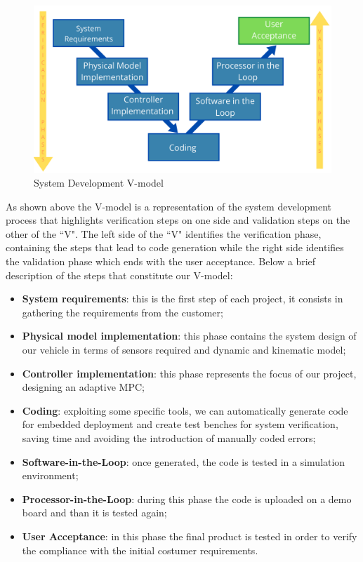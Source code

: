 \begin{figure}[H]
    \centering
    \includegraphics[width=1\textwidth]{Figures/V-MODEL.png}
    \caption{System Development V-model}
    
    \label{fig:V_model}
\end{figure}

As shown above the V-model is a representation of the system development process that highlights verification steps on one side and validation steps on the other of the ``V". The left side of the ``V" identifies the verification phase, containing the steps that lead to code generation while the right side identifies the validation phase which ends with the user acceptance.
Below a brief description of the steps that constitute our V-model:
\begin{itemize}
    \item \textbf{System requirements}: this is the first step of each project, it consists in gathering the requirements from the customer;
    \item \textbf{Physical model implementation}: this phase contains the system design of our vehicle in terms of sensors required and dynamic and kinematic model;
    \item \textbf{Controller implementation}: this phase represents the focus of our project, designing an adaptive MPC;
    \item \textbf{Coding}: exploiting some specific tools, we can automatically generate code for embedded deployment and create test benches for system verification, saving time and avoiding the introduction of manually coded errors;
    \item \textbf{Software-in-the-Loop}: once generated, the code is tested in a simulation environment;
    
    \item \textbf{Processor-in-the-Loop}: during this phase the code is uploaded on a demo board and than it is tested again;
    
    \item \textbf{User Acceptance}: in this phase the final product is tested in order to verify the compliance with the initial costumer requirements.
\end{itemize}

